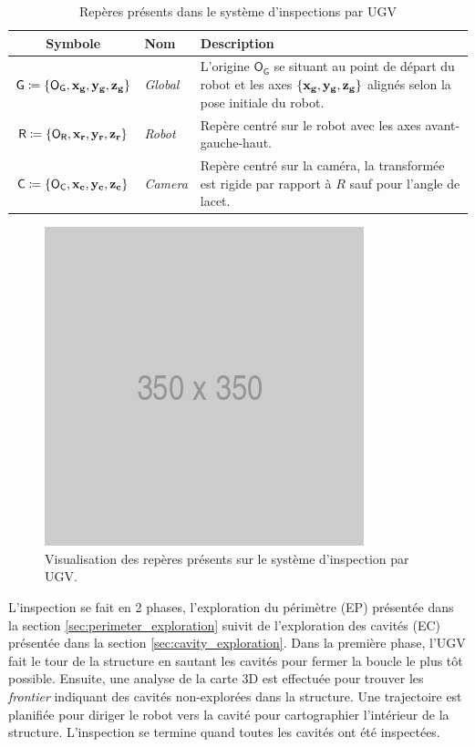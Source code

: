\begin{table}[htp]
  \centering
  \setlength{\tabcolsep}{12pt}
  \begin{tabular}[htp]{|c|l|p{9cm}|}
    \hline
    Symbole & Nom                   & Description\\\hline
    $\mathsf{G} \coloneqq \{\mathsf{O_G}, \mathbf{x_g}, \mathbf{y_g}, \mathbf{z_g} \} $     &  \textit{Global}      & L'origine $\mathsf{O_G}$ se situant au point de départ du robot et les axes $\{\mathbf{x_g}, \mathbf{y_g}, \mathbf{z_g} \}$ alignés selon la pose initiale du robot.\\\hline
    $\mathsf{R} \coloneqq \{\mathsf{O_R}, \mathbf{x_r}, \mathbf{y_r}, \mathbf{z_r} \} $     &  \textit{Robot}       & Repère centré sur le robot avec les axes avant-gauche-haut.\\\hline
    $\mathsf{C} \coloneqq \{\mathsf{O_C}, \mathbf{x_c}, \mathbf{y_c}, \mathbf{z_c} \}$     &  \textit{Camera}      & Repère centré sur la caméra, la transformée est rigide par rapport à $R$ sauf pour l'angle de lacet. \\\hline
  \end{tabular}
  \setlength{\tabcolsep}{6pt}
  \caption{Repères présents dans le système d'inspections par UGV}
  \label{table:ugv_frames}
\end{table}

\begin{figure}[htp]
  \centering
  \includegraphics[width=0.3\linewidth]{images/placeholder.png}
  \caption{Visualisation des repères présents sur le système d'inspection par UGV.}
  \label{fig:ugv_frames}
\end{figure}

L'inspection se fait en 2 phases, l'exploration du périmètre (EP) présentée dans la section \ref{sec:perimeter_exploration} suivit de l'exploration des cavités (EC) présentée dans la section \ref{sec:cavity_exploration}. Dans la première phase, l'UGV fait le tour de la structure en sautant les cavités pour fermer la boucle le plus tôt possible. Ensuite, une analyse de la carte 3D est effectuée pour trouver les \textit{frontier} indiquant des cavités non-explorées dans la structure. Une trajectoire est planifiée pour diriger le robot vers la cavité pour cartographier l'intérieur de la structure. L'inspection se termine quand toutes les cavités ont été inspectées.

